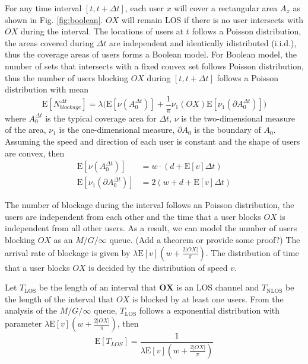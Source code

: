 \documentclass[10pt, conference, letterpaper]{IEEEtran}
\begin{document}
For any time interval $[t, t + \Delta t]$, each user $x$ will cover a rectangular area $A_x$ as shown in Fig. \ref{fig:boolean}. ${OX}$ will remain LOS if there is no user intersects with ${OX}$ during the interval. The locations of users at $t$ follows a Poisson distribution, the areas covered during $\Delta t$ are independent and identically idistributed (i.i.d.), thus the coverage areas of users forms a Boolean model. For Boolean model, the number of sets that intersects with a fixed convex set follows Poisson distribution, thus the number of users blocking ${OX}$ during $[t, t+\Delta t]$ follows a Poisson distribution with mean
\begin{equation}
\mathrm{E}[N_{blockage}^{\Delta t}]=\lambda\big(\mathrm{E}[\nu(A_0^{\Delta t})] + \frac{1}{\pi}\nu_1({OX})\mathrm{E}[\nu_1(\partial A_0^{\Delta t})]\big)
\end{equation}
where $A_0^{\Delta t}$ is the typical coverage area for $\Delta t$, $\nu$ is the two-dimensional measure of the area, $\nu_1$ is the one-dimensional measure, $\partial A_0$ is the boundary of $A_0$. Assuming the speed and direction of each user is constant and the shape of users are convex, then 
\begin{equation*}
\begin{split}
\mathrm{E}[\nu(A_0^{\Delta t})] & = w\cdot (d + \mathrm{E}[v]\Delta t) \\
\mathrm{E}[\nu_1(\partial A_0^{\Delta t})] & = 2(w+d+\mathrm{E}[v] \Delta t)
\end{split}
\end{equation*}

The number of blockage during the interval follows an Poisson distribution, the users are independent from each other and the time that a user blocks $OX$ is independent from all other users. As a result, we can model the number of users blocking $OX$ as an $M/G/\infty$ queue. (Add a theorem or provide some proof?)
The arrival rate of blockage is given by $\lambda\mathrm{E}[v](w+\frac{2|OX|}{\pi})$. The distribution of time that a user blocks $OX$ is decided by the distribution of speed $v$.

Let $T_{\mathrm{LOS}}$ be the length of an interval that $\mathbf{OX}$ is an LOS channel and $T_{\mathrm{NLOS}}$ be the length of the interval that $OX$ is blocked by at least one users. From the analysis of the $M/G/\infty$ queue, $T_{\mathrm{LOS}}$ follows a exponential distribution with parameter $\lambda\mathrm{E}[v](w + \frac{2|OX|}{\pi})$, then
\begin{equation}
\mathrm{E}[T_{LOS}]  = \frac{1}{\lambda\mathrm{E}[v](w + \frac{2|OX|}{\pi})}
\end{equation}
\end{document}
